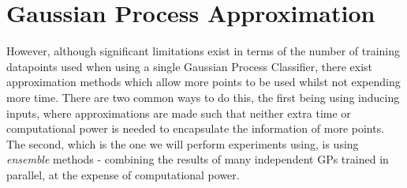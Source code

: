 \section{Gaussian Process Approximation}

However, although significant limitations exist in terms of the number of training datapoints used when using a single Gaussian Process Classifier, there exist approximation methods which allow more points to be used whilst not expending more time. There are two common ways to do this, the first being using inducing inputs, where approximations are made such that neither extra time or computational power is needed to encapsulate the information of more points. The second, which is the one we will perform experiments using, is using \textit{ensemble} methods - combining the results of many independent GPs trained in parallel, at the expense of computational power.

\citep{deisenroth15}

